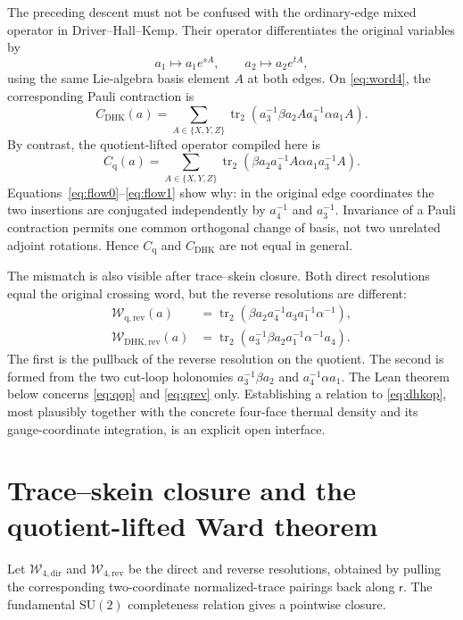 \documentclass[11pt]{article}
\theoremstyle{definition}
\newcommand{\SU}{\mathrm{SU}(2)}
\newcommand{\trn}{\operatorname{tr}_2}
\newcommand{\red}{\mathsf r}
\newcommand{\W}{\mathcal W}
\newcommand{\dir}{\mathrm{dir}}
\newcommand{\rev}{\mathrm{rev}}
\begin{document}
The preceding descent must not be confused with the ordinary-edge mixed
operator in Driver--Hall--Kemp.  Their operator differentiates the original
variables by
\[
 a_1\longmapsto a_1e^{sA},\qquad
 a_2\longmapsto a_2e^{tA},
\]
using the same Lie-algebra basis element $A$ at both edges.  On
\eqref{eq:word4}, the corresponding Pauli contraction is
\begin{equation}\label{eq:dhkop}
 C_{\mathrm{DHK}}(a)=\sum_{A\in\{X,Y,Z\}}
 \trn\!\left(a_3^{-1}\beta a_2 A
              a_4^{-1}\alpha a_1 A\right).
\end{equation}
By contrast, the quotient-lifted operator compiled here is
\begin{equation}\label{eq:qop}
 C_{\mathrm q}(a)=\sum_{A\in\{X,Y,Z\}}
 \trn\!\left(\beta a_2a_4^{-1}A
              \alpha a_1a_3^{-1}A\right).
\end{equation}
Equations~\eqref{eq:flow0}--\eqref{eq:flow1} show why: in the original edge
coordinates the two insertions are conjugated independently by $a_4^{-1}$
and $a_3^{-1}$.  Invariance of a Pauli contraction permits one common
orthogonal change of basis, not two unrelated adjoint rotations.  Hence
$C_{\mathrm q}$ and $C_{\mathrm{DHK}}$ are not equal in general.

The mismatch is also visible after trace--skein closure.  Both direct
resolutions equal the original crossing word, but the reverse resolutions
are different:
\begin{align}
 \W_{\mathrm{q,rev}}(a)
 &=\trn\!\left(\beta a_2a_4^{-1}a_3a_1^{-1}\alpha^{-1}\right),
 \label{eq:qrev}\\
 \W_{\mathrm{DHK,rev}}(a)
 &=\trn\!\left(a_3^{-1}\beta a_2a_1^{-1}\alpha^{-1}a_4\right).
 \label{eq:dhkrev}
\end{align}
The first is the pullback of the reverse resolution on the quotient.  The
second is formed from the two cut-loop holonomies
$a_3^{-1}\beta a_2$ and $a_4^{-1}\alpha a_1$.  The Lean theorem below concerns
\eqref{eq:qop} and \eqref{eq:qrev} only.  Establishing a relation to
\eqref{eq:dhkop}, most plausibly together with the concrete four-face thermal
density and its gauge-coordinate integration, is an explicit open interface.

\section{Trace--skein closure and the quotient-lifted Ward theorem}

Let $\W_{4,\dir}$ and $\W_{4,\rev}$ be the direct and reverse resolutions,
obtained by pulling the corresponding two-coordinate normalized-trace
pairings back along $\red$.  The fundamental $\SU$ completeness relation
gives a pointwise closure.
\end{document}
